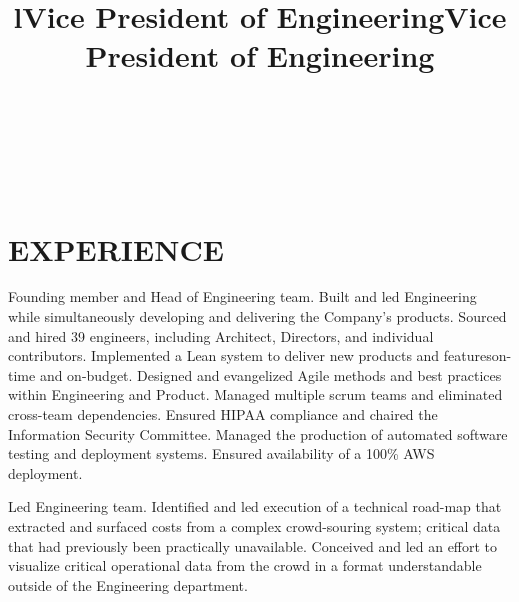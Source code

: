 \documentclass[margin]{res}
\begin{document}
\bigskip

\address{2263 Derby St.\\ken@hero.net}
\address{Berkeley, CA 94705\\(310) 383}

\begin{resume}

\begin{format}
\title{l}\\
\\
\body\\
\end{format}

\section{EXPERIENCE}
\title{\textbf{Vice President of Engineering}}
\begin{position}
\hspace*{.5cm}Founding member and Head of Engineering team.  Built and led Engineering while simultaneously developing and delivering the Company's products. Sourced and hired 39 engineers, including Architect, Directors, and individual contributors.  Implemented a Lean system to deliver new products and features\textemdash on-time and on-budget. Designed and evangelized Agile methods and best practices within Engineering and Product. Managed multiple scrum teams and eliminated cross-team dependencies.  Ensured HIPAA compliance and chaired the Information Security Committee.  Managed the production of automated software testing and deployment systems.  Ensured availability of a 100\% AWS deployment.
\end{position}

\title{\textbf{Vice President of Engineering}}
\begin{position}
\hspace*{.5cm}Led Engineering team. Identified and led execution of a technical road-map that extracted and surfaced costs from a complex crowd-souring system; critical data that had previously been practically unavailable. Conceived and led an effort to visualize critical operational data from the crowd in a format understandable outside of the Engineering department.
\end{position}


\end{resume}
\end{document}
